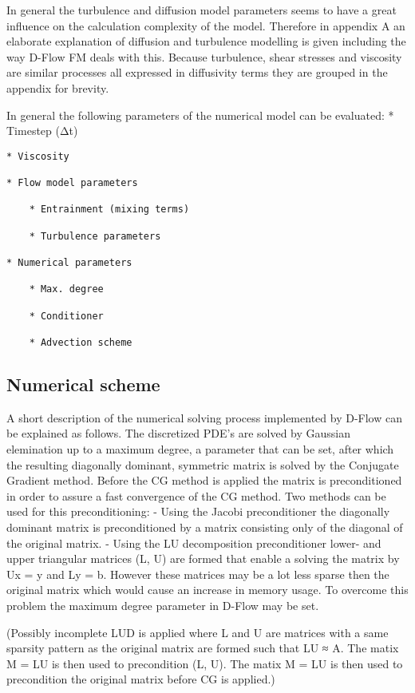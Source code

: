 In general the turbulence and diffusion model parameters seems to have a
great influence on the calculation complexity of the model. Therefore in
appendix A an elaborate explanation of diffusion and turbulence
modelling is given including the way D-Flow FM deals with this. Because
turbulence, shear stresses and viscosity are similar processes all
expressed in diffusivity terms they are grouped in the appendix for
brevity.

In general the following parameters of the numerical model can be
evaluated: * Timestep (Δt)

\begin{verbatim}
* Viscosity

* Flow model parameters

    * Entrainment (mixing terms)

    * Turbulence parameters

* Numerical parameters 

    * Max. degree

    * Conditioner

    * Advection scheme
\end{verbatim}

\subsection{Numerical scheme}\label{numerical-scheme}

A short description of the numerical solving process implemented by
D-Flow can be explained as follows. The discretized PDE's are solved by
Gaussian elemination up to a maximum degree, a parameter that can be
set, after which the resulting diagonally dominant, symmetric matrix is
solved by the Conjugate Gradient method. Before the CG method is applied
the matrix is preconditioned in order to assure a fast convergence of
the CG method. Two methods can be used for this preconditioning: - Using
the Jacobi preconditioner the diagonally dominant matrix is
preconditioned by a matrix consisting only of the diagonal of the
original matrix. - Using the LU decomposition preconditioner lower- and
upper triangular matrices (L, U) are formed that enable a solving the
matrix by Ux = y and Ly = b. However these matrices may be a lot less
sparse then the original matrix which would cause an increase in memory
usage. To overcome this problem the maximum degree parameter in D-Flow
may be set.

\citep[ p.21]{DFlowTechMan}

(Possibly incomplete LUD is applied where L and U are matrices with a
same sparsity pattern as the original matrix are formed such that LU ≈
A. The matix M = LU is then used to precondition (L, U). The matix M =
LU is then used to precondition the original matrix before CG is
applied.)
